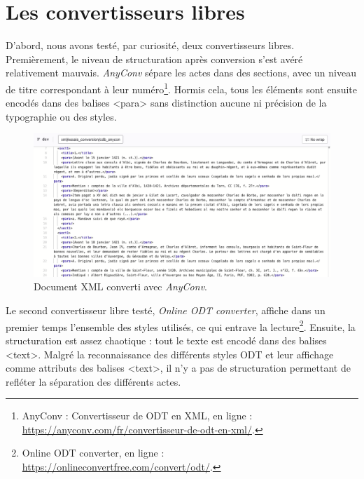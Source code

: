 \section{Les convertisseurs libres}
\label{II.4.1}

\par D'abord, nous avons testé, par curiosité, deux convertisseurs libres. Premièrement, le niveau de structuration après conversion s’est avéré relativement mauvais. \textit{AnyConv} sépare les actes dans des sections, avec un niveau de titre correspondant à leur numéro\footnote{AnyConv : Convertisseur de ODT en XML, en ligne : \url{https://anyconv.com/fr/convertisseur-de-odt-en-xml/}.}. Hormis cela, tous les éléments sont ensuite encodés dans des balises <para> sans distinction aucune ni précision de la typographie ou des styles. 

\begin{figure}[ht!]
    \centering
    \includegraphics[scale=0.4]{img/any_conv.png}
    \caption{Document XML converti avec \textit{AnyConv}.}
    \label{fig:any_conv}
\end{figure}

\par Le second convertisseur libre testé, \textit{Online ODT converter}, affiche dans un premier temps l’ensemble des styles utilisés, ce qui entrave la lecture\footnote{Online ODT converter, en ligne : \url{https://onlineconvertfree.com/convert/odt/}.}. Ensuite, la structuration est assez chaotique : tout le texte est encodé dans des balises <text>. Malgré la reconnaissance des différents styles ODT et leur affichage comme attributs des balises <text>, il n’y a pas de structuration permettant de refléter la séparation des différents actes. 

